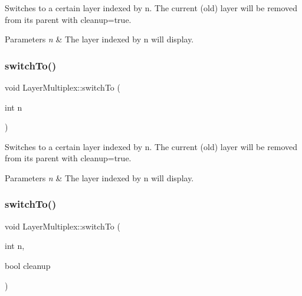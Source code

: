 Switches to a certain layer indexed by n. The current (old) layer will be removed from it\textquotesingle{}s parent with \textquotesingle{}cleanup=true\textquotesingle{}.


\begin{DoxyParams}{Parameters}
{\em n} & The layer indexed by n will display. \\
\hline
\end{DoxyParams}
\mbox{\label{classLayerMultiplex_a2c9ab67b2b94e447a92d94fb28d45f89}} 
\subsubsection{\texorpdfstring{switch\+To()}{switchTo()}\hspace{0.1cm}{\footnotesize\ttfamily [2/3]}}
{\footnotesize\ttfamily void Layer\+Multiplex\+::switch\+To (\begin{DoxyParamCaption}\item[{int}]{n }\end{DoxyParamCaption})}

Switches to a certain layer indexed by n. The current (old) layer will be removed from it\textquotesingle{}s parent with \textquotesingle{}cleanup=true\textquotesingle{}.


\begin{DoxyParams}{Parameters}
{\em n} & The layer indexed by n will display. \\
\hline
\end{DoxyParams}
\mbox{\label{classLayerMultiplex_a9cc4ff3d07e1aec62b3bb4773025671c}} 
\subsubsection{\texorpdfstring{switch\+To()}{switchTo()}\hspace{0.1cm}{\footnotesize\ttfamily [3/3]}}
{\footnotesize\ttfamily void Layer\+Multiplex\+::switch\+To (\begin{DoxyParamCaption}\item[{int}]{n,  }\item[{bool}]{cleanup }\end{DoxyParamCaption})}

